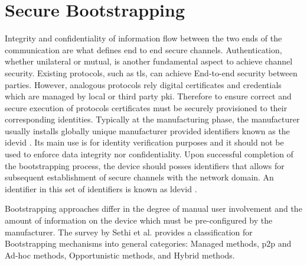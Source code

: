\chapter{Secure Bootstrapping}
\label{ch:secureBootstrapping}

Integrity and confidentiality of information flow between the two ends of the communication are what defines end to end secure channels. Authentication, whether unilateral or mutual, is another fundamental aspect to achieve channel security. Existing protocols, such as \gls{tls}, can achieve End-to-end security between parties. However, analogous protocols rely digital certificates and credentials which are managed by local or third party \gls{pki}. Therefore to ensure correct and secure execution of protocols certificates must be securely provisioned to their corresponding identities. Typically at the manufacturing phase, the manufacturer usually installs globally unique manufacturer provided identifiers known as the \gls{idevid} \cite{5367679}. Its main use is for identity verification purposes and it should not be used to enforce data integrity nor confidentiality. Upon successful completion of the bootstrapping process, the device should posses identifiers that allows for subsequent establishment of secure channels with the network domain. An identifier in this set of identifiers is known as \gls{ldevid} \cite{5367679}.
\par
Bootstrapping approaches differ in the degree of manual user involvement and the amount of information on the device which must be pre-configured by the manufacturer. The survey by Sethi et al. \cite{irtf-t2trg-secure-bootstrapping-00} provides a classification for Bootstrapping mechanisms into general categories: Managed methods, \gls{p2p} and Ad-hoc methods, Opportunistic methods, and Hybrid methods.
